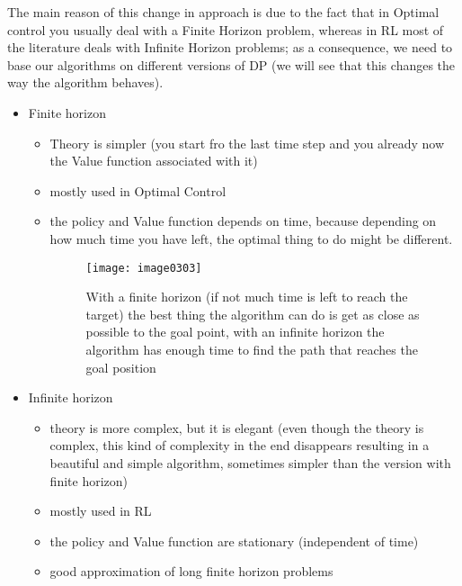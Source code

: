 The main reason of this change in approach is due to the fact that in Optimal control you usually deal with a Finite Horizon problem, whereas in RL most of the literature deals with Infinite Horizon problems; as a consequence, we need to base our algorithms on different versions of DP (we will see that this changes the way the algorithm behaves).

\begin{itemize}
\item Finite horizon
\begin{itemize}
\item Theory is simpler (you start fro the last time step and you already now the Value function associated with it)
\item mostly used in Optimal Control
\item the policy and Value function depends on time, because depending on how much time you have left, the optimal thing to do might be different.

\begin{figure}[!h]
\centering
\texttt{[image: image0303]}
\caption{With a finite horizon (if not much time is left to reach the target) the best thing the algorithm can do is get as close as possible to the goal point, with an infinite horizon the algorithm has enough time to find the path that reaches the goal position}
\end{figure}
\end{itemize}
\item Infinite horizon
\begin{itemize}
\item theory is more complex, but it is elegant (even though the theory is complex, this kind of complexity in the end disappears resulting in a beautiful and simple algorithm, sometimes simpler than the version with finite horizon)
\item mostly used in RL
\item the policy and Value function are stationary (independent of time)
\item good approximation of long finite horizon problems
\end{itemize}
\end{itemize}

